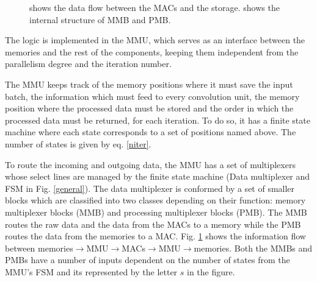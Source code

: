 \documentclass[conference,compsoc]{IEEEtran}
\begin{document}
\begin{figure}[!t]
\centering
{}
\hfil \vspace{0.1cm}
\centering
{}
\caption{\protect{} shows the data flow between the MACs and the
  storage. \protect{} shows the internal structure of MMB and PMB.}
\label{muxes}
\end{figure}




The logic is implemented in the MMU, which serves as an interface between
the memories and the rest of the components, keeping them independent from the
parallelism degree and the iteration number.

The MMU keeps track of the memory
positions where it must save the input batch, the information which must feed
to every convolution unit, the memory position where the processed data must be
stored and the order in which the processed data must be returned, for each iteration.
To do so, it has a finite state machine where each state corresponds to a set of
positions named above. The number of states is given by eq. \ref{niter}.

To route the incoming and outgoing data, the MMU has a set of multiplexers whose
select lines are managed by the finite state machine (Data multiplexer and FSM
in Fig. \ref{general}). The data multiplexer is conformed by a set of smaller
blocks which are classified into two classes depending on their function: memory
multiplexer blocks (MMB) and processing multiplexer blocks (PMB). The MMB routes
the raw data and the data from the MACs to a memory while the PMB routes the
data from the memories to a MAC. Fig. \ref{muxes} shows the information flow
between
memories$\rightarrow$MMU$\rightarrow$MACs$\rightarrow$MMU$\rightarrow$memories.
Both the MMBs and PMBs have a number of inputs dependent on the number of states
from the MMU's FSM and its represented by the letter $s$ in the figure.
\end{document}
